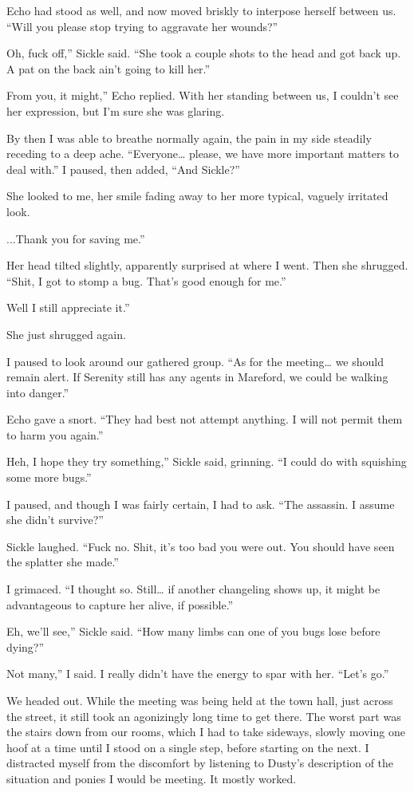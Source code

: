 Echo had stood as well, and now moved briskly to interpose herself between us. “Will you please stop trying to aggravate her wounds?”

\leavevmode{}Oh, fuck off,” Sickle said. “She took a couple shots to the head and got back up. A pat on the back ain’t going to kill her.”

\leavevmode{}From you, it might,” Echo replied. With her standing between us, I couldn’t see her expression, but I’m sure she was glaring.

By then I was able to breathe normally again, the pain in my side steadily receding to a deep ache. “Everyone… please, we have more important matters to deal with.” I paused, then added, “And Sickle?”

She looked to me, her smile fading away to her more typical, vaguely irritated look.

\leavevmode{}...Thank you for saving me.”

Her head tilted slightly, apparently surprised at where I went. Then she shrugged. “Shit, I got to stomp a bug. That’s good enough for me.”

\leavevmode{}Well I still appreciate it.”

She just shrugged again.

I paused to look around our gathered group. “As for the meeting… we should remain alert. If Serenity still has any agents in Mareford, we could be walking into danger.”

Echo gave a snort. “They had best not attempt anything. I will not permit them to harm you again.”

\leavevmode{}Heh, I hope they try something,” Sickle said, grinning. “I could do with squishing some more bugs.”

I paused, and though I was fairly certain, I had to ask. “The assassin. I assume she didn’t survive?”

Sickle laughed. “Fuck no. Shit, it’s too bad you were out. You should have seen the splatter she made.”

I grimaced. “I thought so. Still… if another changeling shows up, it might be advantageous to capture her alive, if possible.”

\leavevmode{}Eh, we’ll see,” Sickle said. “How many limbs can one of you bugs lose before dying?”

\leavevmode{}Not many,” I said. I really didn’t have the energy to spar with her. “Let’s go.”

We headed out. While the meeting was being held at the town hall, just across the street, it still took an agonizingly long time to get there. The worst part was the stairs down from our rooms, which I had to take sideways, slowly moving one hoof at a time until I stood on a single step, before starting on the next. I distracted myself from the discomfort by listening to Dusty’s description of the situation and ponies I would be meeting. It mostly worked.

